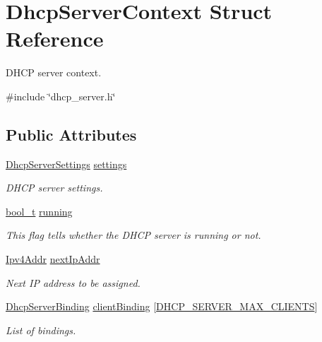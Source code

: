 \hypertarget{structDhcpServerContext}{}\section{Dhcp\+Server\+Context Struct Reference}
\label{structDhcpServerContext}


D\+H\+CP server context.  




{\ttfamily \#include \char`\"{}dhcp\+\_\+server.\+h\char`\"{}}

\subsection*{Public Attributes}
\begin{DoxyCompactItemize}
\item 
\hyperlink{structDhcpServerSettings}{Dhcp\+Server\+Settings} \hyperlink{structDhcpServerContext_a63471f8a788839b2b8cfdee9d97c32fb}{settings}
\begin{DoxyCompactList}\small\item\em D\+H\+CP server settings. \end{DoxyCompactList}\item 
\hyperlink{compiler__port_8h_a812d16e5494522586b3784e55d479912}{bool\+\_\+t} \hyperlink{structDhcpServerContext_abaf75d5113b57268dea728e946a1029b}{running}
\begin{DoxyCompactList}\small\item\em This flag tells whether the D\+H\+CP server is running or not. \end{DoxyCompactList}\item 
\hyperlink{ipv4_8h_a411debb3d770caa0c06d3f73367da37f}{Ipv4\+Addr} \hyperlink{structDhcpServerContext_aa6df6d5693549dcf2d1cd6570e7a3389}{next\+Ip\+Addr}
\begin{DoxyCompactList}\small\item\em Next IP address to be assigned. \end{DoxyCompactList}\item 
\hyperlink{structDhcpServerBinding}{Dhcp\+Server\+Binding} \hyperlink{structDhcpServerContext_a15ab325de708c7913708082f2e04bb75}{client\+Binding} \mbox{[}\hyperlink{dhcp__server_8h_aedfad8c8acee15994969b8ebd1bc0333}{D\+H\+C\+P\+\_\+\+S\+E\+R\+V\+E\+R\+\_\+\+M\+A\+X\+\_\+\+C\+L\+I\+E\+N\+TS}\mbox{]}
\begin{DoxyCompactList}\small\item\em List of bindings. \end{DoxyCompactList}\end{DoxyCompactItemize}



